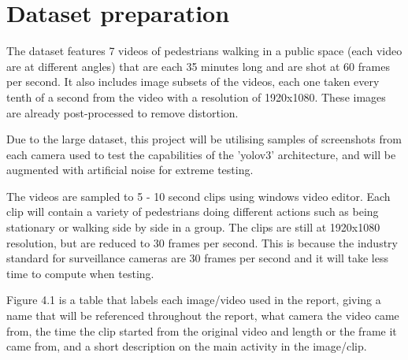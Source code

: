 \documentclass[12pt]{report}
\begin{document}
\section{Dataset preparation}

The dataset features 7 videos of pedestrians walking in a public space (each video are at different angles) that are each 35 minutes long and are shot at 60 frames per second. It also includes image subsets of the videos, each one taken every tenth of a second from the video with a resolution of 1920x1080. These images are already post-processed to remove distortion.

\vspace{2mm}

Due to the large dataset, this project will be utilising samples of screenshots from each camera used to test the capabilities of the 'yolov3' architecture, and will be augmented with artificial noise for extreme testing.

\vspace{2mm}

The videos are sampled to 5 - 10 second clips using windows video editor. Each clip will contain a variety of pedestrians doing different actions such as being stationary or walking side by side in a group. The clips are still at 1920x1080 resolution, but are reduced to 30 frames per second. This is because the industry standard for surveillance cameras are 30 frames per second and it will take less time to compute when testing.

\vspace{2mm}

Figure 4.1 is a table that labels each image/video used in the report, giving a name that will be referenced throughout the report, what camera the video came from, the time the clip started from the original video and length or the frame it came from, and a short description on the main activity in the image/clip.

\vspace{5mm}
\end{document}
